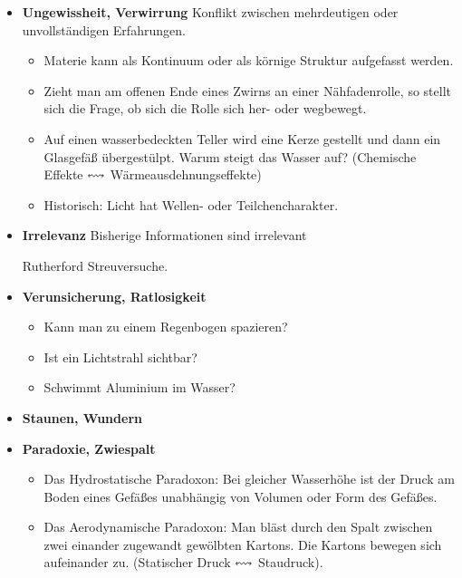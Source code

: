\begin{itemize}
	
	
	\item {\bf Ungewissheit, Verwirrung}
	Konflikt zwischen mehrdeutigen oder unvollst\"{a}ndigen Erfahrungen.
	
	\begin{beisp}
		\begin{itemize}
		\item
		Materie kann als Kontinuum oder als k\"{o}rnige Struktur aufgefasst
		werden.
		\item
		Zieht man am offenen Ende eines Zwirns an einer N\"{a}hfadenrolle,
		so stellt sich die Frage, ob sich die Rolle sich her- oder wegbewegt.
		\item
		Auf einen wasserbedeckten Teller wird eine Kerze gestellt und dann
		ein Glasgef\"{a}{\ss} \"{u}bergest\"{u}lpt.
		Warum steigt das Wasser auf? (Chemische Effekte $\leftrightsquigarrow$
		W\"{a}rmeausdehnungseffekte)
		\item
		Historisch: Licht hat Wellen- oder Teilchencharakter.
		\end{itemize}
	\end{beisp}
	

	
	\item {\bf Irrelevanz}
	Bisherige Informationen sind irrelevant
	\begin{beisp}
		Rutherford Streuversuche.
	\end{beisp}
	
	\item {\bf Verunsicherung, Ratlosigkeit}
	\begin{beisp}
			\begin{itemize}
		\item
		Kann man zu einem Regenbogen spazieren?
		\item
		Ist ein Lichtstrahl sichtbar?
		\item
		Schwimmt Aluminium im Wasser?
	\end{itemize}
	\end{beisp}

	
	\item {\bf Staunen, Wundern}
	\item {\bf Paradoxie, Zwiespalt}
	\begin{beisp}
		\begin{itemize}
		\item
		Das Hydrostatische Paradoxon: Bei gleicher Wasserh\"{o}he ist der
		Druck am Boden eines Gef\"{a}{\ss}es unabh\"{a}ngig von Volumen oder Form
		des Gef\"{a}{\ss}es.
		\item
		Das Aerodynamische Paradoxon: Man bl\"{a}st durch den Spalt zwischen
		zwei einander zugewandt gew\"{o}lbten Kartons.
		Die Kartons bewegen sich aufeinander zu.
		(Statischer Druck $\leftrightsquigarrow$ Staudruck).
		

\end{itemize}
\end{beisp}
\end{itemize}
